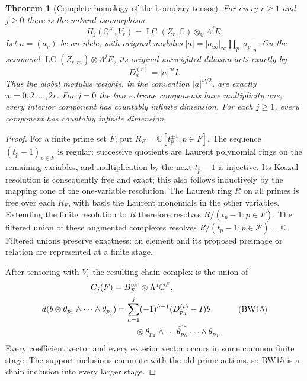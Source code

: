 \documentclass[11pt]{article}
\newtheorem{theorem}{Theorem}
\newcommand{\C}{\mathbb C}
\newcommand{\Q}{\mathbb Q}
\newcommand{\LC}{\operatorname{LC}}
\begin{document}
\begin{theorem}[Complete homology of the boundary tensor]
For every $r\ge1$ and $j\ge0$ there is the natural isomorphism
\[
 H_j(\Q^\times,V_r)
   =\LC(Z_r,\C)\otimes_\C\Lambda^jE.
 \tag{BW13}
\]
Let $a=(a_v)$ be an idele, with original modulus
$|a|=|a_\infty|_\infty\prod_p|a_p|_p$. On the summand
$\LC(Z_{r,m})\otimes\Lambda^jE$, its original unweighted
dilation acts exactly by
\[
 D_a^{(r)}=|a|^m I.
 \tag{BW14}
\]
Thus the global modulus weights, in the convention
$|a|^{w/2}$, are exactly $w=0,2,\ldots,2r$. For $j=0$ the
two extreme components have multiplicity one; every interior
component has countably infinite dimension. For each $j\ge1$,
every component has countably infinite dimension.
\end{theorem}
\begin{proof}
For a finite prime set $F$, put
$R_F=\C[t_p^{\pm1}:p\in F]$. The sequence $(t_p-1)_{p\in F}$
is regular: successive quotients are Laurent polynomial rings on
the remaining variables, and multiplication by the next $t_p-1$
is injective. Its Koszul resolution is consequently free and exact;
this also follows inductively by the mapping cone of the
one-variable resolution. The Laurent ring $R$ on all primes is free
over each $R_F$, with basis the Laurent monomials in the other
variables. Extending the finite resolution to $R$ therefore resolves
$R/(t_p-1:p\in F)$. The filtered union of these augmented complexes
resolves $R/(t_p-1:p\in\mathcal P)=\C$. Filtered unions preserve
exactness: an element and its proposed preimage or relation are
represented at a finite stage.

After tensoring with $V_r$ the resulting chain complex is the
union of
\[
 \begin{gathered}
 C_j(F)=B_F^{\otimes r}\otimes\Lambda^j\C^F,\\
 \begin{aligned}
 d(b\otimes\theta_{p_1}\wedge\cdots\wedge\theta_{p_j})
 &=\sum_{h=1}^j(-1)^{h-1}(D_{p_h}^{(r)}-I)b\\
 &\hspace{8mm}\otimes\theta_{p_1}\wedge\cdots
              \widehat{\theta_{p_h}}\cdots\wedge\theta_{p_j}.
 \end{aligned}
 \end{gathered}
 \tag{BW15}
\]
Every coefficient vector and every exterior vector occurs in some
common finite stage. The support inclusions commute with the old
prime actions, so BW15 is a chain inclusion into every larger stage.


\end{proof}
\end{document}
